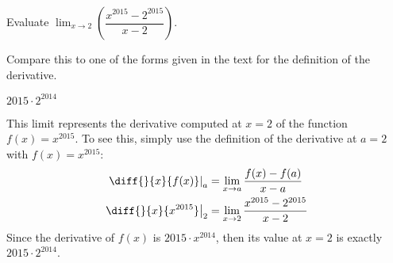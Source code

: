 \begin{question}[2015Q]
Evaluate $\displaystyle \lim_{x\to 2}\left(
\dfrac{x^{2015}-2^{2015}}{x-2}\right).$
\end{question}
\begin{hint}
Compare this to one of the forms given in the text for the definition of the derivative.
\end{hint}
\begin{answer}
{$2015\cdot 2^{2014}$}
\end{answer}
\begin{solution}
This limit represents the derivative computed at $x=2$ of the function $f(x)=x^{2015}$.
To see this, simply use the definition of the derivative at $a=2$ with $f(x)=x^{2015}$:
\begin{align*}
\left.\diff{}{x}\{f(x)\}\right|_{a} &= \lim_{x \to a}\frac{f(x)-f(a)}{x-a}\\
\left.\diff{}{x}\{x^{2015}\}\right|_{2} &=\lim_{x\to2} \frac{x^{2015}-2^{2015}}{x-2}
\end{align*}
Since the derivative of $f(x)$ is $2015\cdot x^{2014}$, then its value at $x=2$ is exactly $2015\cdot 2^{2014}$.
\end{solution}
